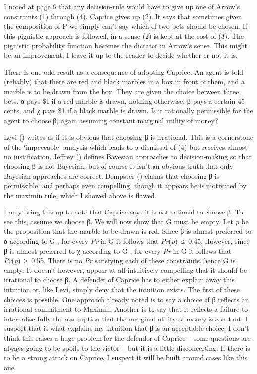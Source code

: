 \documentclass[
  11pt,
  letterpaper,
  DIV=11,
  numbers=noendperiod,
  twoside]{scrartcl}
\begin{document}
I noted at page 6 that any decision-rule would have to give up one of
Arrow's constraints (1) through (4). Caprice gives up (2). It says that
sometimes given the composition of P we simply can't say which of two
bets should be chosen. If this pignistic approach is followed, in a
sense (2) is kept at the cost of (3). The pignistic probability function
becomes the dictator in Arrow's sense. This might be an improvement; I
leave it up to the reader to decide whether or not it is.

There is one odd result as a consequence of adopting Caprice. An agent
is told (reliably) that there are red and black marbles in a box in
front of them, and a marble is to be drawn from the box. They are given
the choice between three bets. α pays \$1 if a red marble is drawn,
nothing otherwise, β pays a certain 45 cents, and χ pays \$1 if a black
marble is drawn. Is it rationally permissible for the agent to choose β,
again assuming constant marginal utility of money?

Levi () writes as if it is obvious that
choosing β is irrational. This is a cornerstone of the `impeccable'
analysis which leads to a dismissal of (4) but receives almost no
justification. Jeffrey () defines
Bayesian approaches to decision-making so that choosing β is not
Bayesian, but of course it isn't an obvious truth that only Bayesian
approaches are correct. Dempster ()
claims that choosing β is permissible, and perhaps even compelling,
though it appears he is motivated by the maximin rule, which I showed
above is flawed.

I only bring this up to note that Caprice says it is not rational to
choose β. To see this, assume we choose β. We will now show that G must
be empty. Let \emph{p} be the proposition that the marble to be drawn is
red. Since β is almost preferred to α according to G , for every
\emph{Pr} in G it follows that \emph{Pr}(\emph{p})~≤~0.45. However,
since β is almost preferred to χ according to G , for every \emph{Pr} in
G it follows that \emph{Pr}(\emph{p})~≥~0.55. There is no \emph{Pr}
satisfying each of these constraints, hence G is empty. It doesn't
however, appear at all intuitively compelling that it should be
irrational to choose β. A defender of Caprice has to either explain away
this intuition or, like Levi, simply deny that the intuition exists. The
first of these choices is possible. One approach already noted is to say
a choice of β reflects an irrational commitment to Maximin. Another is
to say that it reflects a failure to internalise fully the assumption
that the marginal utility of money is constant. I suspect that is what
explains my intuition that β is an acceptable choice. I don't think this
raises a huge problem for the defender of Caprice -- some questions are
always going to be spoils to the victor -- but it is a little
disconcerting. If there is to be a strong attack on Caprice, I suspect
it will be built around cases like this one.
\end{document}

